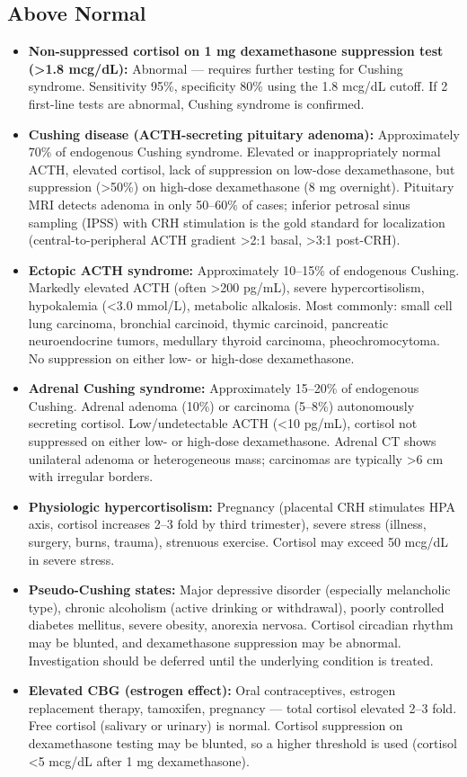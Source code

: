 \subsection*{Above Normal}
\begin{itemize}
  \item \textbf{Non-suppressed cortisol on 1 mg dexamethasone suppression test (>1.8 mcg/dL):} Abnormal --- requires further testing for Cushing syndrome. Sensitivity 95\%, specificity 80\% using the 1.8 mcg/dL cutoff. If 2 first-line tests are abnormal, Cushing syndrome is confirmed.
  \item \textbf{Cushing disease (ACTH-secreting pituitary adenoma):} Approximately 70\% of endogenous Cushing syndrome. Elevated or inappropriately normal ACTH, elevated cortisol, lack of suppression on low-dose dexamethasone, but suppression (>50\%) on high-dose dexamethasone (8 mg overnight). Pituitary MRI detects adenoma in only 50--60\% of cases; inferior petrosal sinus sampling (IPSS) with CRH stimulation is the gold standard for localization (central-to-peripheral ACTH gradient >2:1 basal, >3:1 post-CRH).
  \item \textbf{Ectopic ACTH syndrome:} Approximately 10--15\% of endogenous Cushing. Markedly elevated ACTH (often >200 pg/mL), severe hypercortisolism, hypokalemia (<3.0 mmol/L), metabolic alkalosis. Most commonly: small cell lung carcinoma, bronchial carcinoid, thymic carcinoid, pancreatic neuroendocrine tumors, medullary thyroid carcinoma, pheochromocytoma. No suppression on either low- or high-dose dexamethasone.
  \item \textbf{Adrenal Cushing syndrome:} Approximately 15--20\% of endogenous Cushing. Adrenal adenoma (10\%) or carcinoma (5--8\%) autonomously secreting cortisol. Low/undetectable ACTH (<10 pg/mL), cortisol not suppressed on either low- or high-dose dexamethasone. Adrenal CT shows unilateral adenoma or heterogeneous mass; carcinomas are typically >6 cm with irregular borders.
  \item \textbf{Physiologic hypercortisolism:} Pregnancy (placental CRH stimulates HPA axis, cortisol increases 2--3 fold by third trimester), severe stress (illness, surgery, burns, trauma), strenuous exercise. Cortisol may exceed 50 mcg/dL in severe stress.
  \item \textbf{Pseudo-Cushing states:} Major depressive disorder (especially melancholic type), chronic alcoholism (active drinking or withdrawal), poorly controlled diabetes mellitus, severe obesity, anorexia nervosa. Cortisol circadian rhythm may be blunted, and dexamethasone suppression may be abnormal. Investigation should be deferred until the underlying condition is treated.
  \item \textbf{Elevated CBG (estrogen effect):} Oral contraceptives, estrogen replacement therapy, tamoxifen, pregnancy --- total cortisol elevated 2--3 fold. Free cortisol (salivary or urinary) is normal. Cortisol suppression on dexamethasone testing may be blunted, so a higher threshold is used (cortisol <5 mcg/dL after 1 mg dexamethasone).
\end{itemize}

